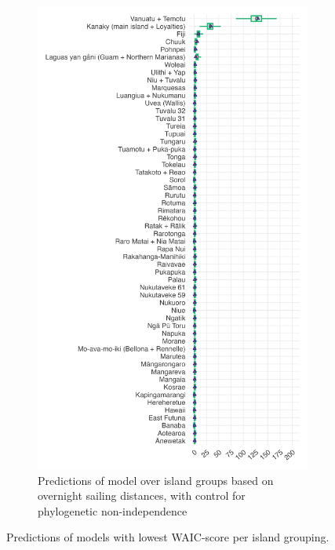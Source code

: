 \documentclass[unnumsec,webpdf,modern,medium]{oup-authoring-template}
\begin{document}
\begin{figure}
\begin{subfigure}{0.48\textwidth}
  \includegraphics[width=1\textwidth]{brms_predict_SBZR_control_phylo.png}
  \caption{Predictions of model over island groups based on overnight sailing distances, with control for phylogenetic non-independence}
\label{SBZR_model_predict}
\end{subfigure}
\caption{Predictions of models with lowest WAIC-score per island grouping.}
\label{prediction_plot}
\end{figure}

\end{document}
